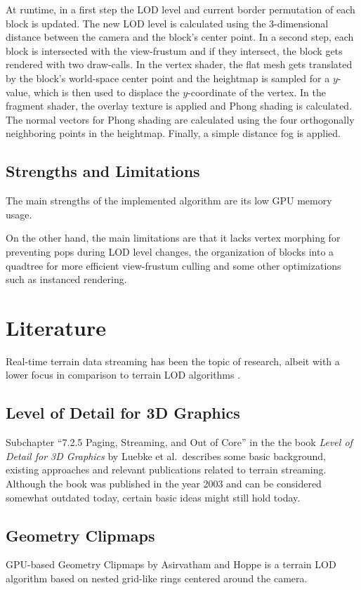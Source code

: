 At runtime, in a first step the LOD level and current border permutation of each block 
is updated. The new LOD level is calculated using the 3-dimensional distance between the camera 
and the block's center point.
In a second step, each block is intersected with the view-frustum 
and if they intersect, the block gets rendered with two draw-calls.
In the vertex shader, the flat mesh gets translated by the block's world-space center point
and the heightmap is sampled for a $y$-value, which is then used to displace the $y$-coordinate of the vertex. 
In the fragment shader, the overlay texture is applied and Phong shading is calculated.
The normal vectors for Phong shading are calculated using the four orthogonally neighboring points 
in the heightmap. Finally, a simple distance fog is applied.

\subsection{Strengths and Limitations}
The main strengths of the implemented algorithm are
its low GPU memory usage.

On the other hand, the main limitations are that it lacks vertex morphing for preventing
pops during LOD level changes, the organization of blocks into a quadtree for 
more efficient view-frustum culling and some other optimizations 
such as instanced rendering.

\section{Literature}
Real-time terrain data streaming has been the topic of research, albeit with a lower 
focus in comparison to terrain LOD algorithms \cite{vtpothers}.

\subsection{Level of Detail for 3D Graphics}
Subchapter ``7.2.5 Paging, Streaming, and Out of Core''
in the the book \textit{Level of Detail for 3D Graphics} 
by Luebke et al.~describes some basic background, existing approaches and relevant publications 
related to terrain streaming. Although the book was published in the year 2003 and can be considered somewhat outdated 
today, certain basic ideas might still hold today.

\subsection{Geometry Clipmaps}
GPU-based Geometry Clipmaps by Asirvatham and Hoppe is a terrain LOD algorithm
based on nested grid-like rings centered around the camera. 

